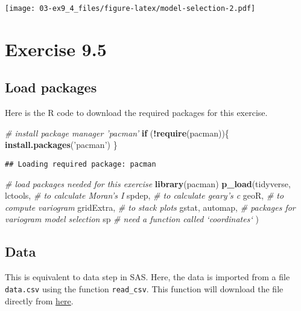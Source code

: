 \documentclass[]{book}
\newenvironment{Shaded}{\begin{snugshade}}{\end{snugshade}}
\newcommand{\CommentTok}[1]{\textcolor[rgb]{0.56,0.35,0.01}{\textit{#1}}}
\newcommand{\ControlFlowTok}[1]{\textcolor[rgb]{0.13,0.29,0.53}{\textbf{#1}}}
\newcommand{\KeywordTok}[1]{\textcolor[rgb]{0.13,0.29,0.53}{\textbf{#1}}}
\newcommand{\NormalTok}[1]{#1}
\newcommand{\OperatorTok}[1]{\textcolor[rgb]{0.81,0.36,0.00}{\textbf{#1}}}
\newcommand{\StringTok}[1]{\textcolor[rgb]{0.31,0.60,0.02}{#1}}
\begin{document}
\texttt{[image: 03-ex9\_4\_files/figure-latex/model-selection-2.pdf]}

\hypertarget{ex9_5}{%
\chapter{Exercise 9.5}\label{ex9_5}}

\hypertarget{load-packages-3}{%
\section{Load packages}\label{load-packages-3}}

Here is the R code to download the required packages for this exercise.

\begin{Shaded}
\begin{Highlighting}[]
\CommentTok{# install package manager 'pacman'}
\ControlFlowTok{if}\NormalTok{ (}\OperatorTok{!}\KeywordTok{require}\NormalTok{(pacman))\{}
  \KeywordTok{install.packages}\NormalTok{(}\StringTok{'pacman'}\NormalTok{)}
\NormalTok{\}}
\end{Highlighting}
\end{Shaded}

\begin{verbatim}
## Loading required package: pacman
\end{verbatim}

\begin{Shaded}
\begin{Highlighting}[]
\CommentTok{# load packages needed for this exercise}
\KeywordTok{library}\NormalTok{(pacman)}
\KeywordTok{p_load}\NormalTok{(tidyverse,}
\NormalTok{       lctools, }\CommentTok{# to calculate Moran's I}
\NormalTok{       spdep, }\CommentTok{# to calculate geary's c}
\NormalTok{       geoR, }\CommentTok{# to compute variogram}
\NormalTok{       gridExtra, }\CommentTok{# to stack plots}
\NormalTok{       gstat, automap, }\CommentTok{# packages for variogram model selection}
\NormalTok{       sp }\CommentTok{# need a function called `coordinates`}
\NormalTok{       )}
\end{Highlighting}
\end{Shaded}

\hypertarget{data-2}{%
\section{Data}\label{data-2}}

This is equivalent to data step in SAS. Here, the data is imported from a file \texttt{data.csv} using the function \texttt{read\_csv}. This function will download the file directly from \href{https://raw.githubusercontent.com/luckymehra/epidem-exercises/master/data/ex9_5.csv}{here}.
\end{document}
